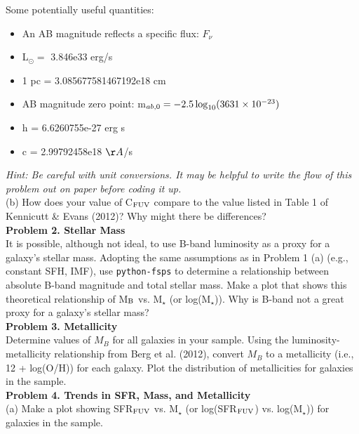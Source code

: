\documentclass{article}
\begin{document}
\noindent Some potentially useful quantities:

 \begin{itemize}
\item An AB magnitude reflects a specific flux: $F_{\nu}$
\item L$_{\odot} =$ 3.846e33 erg/s
\item 1 pc = 3.085677581467192e18 cm
\item AB magnitude zero point: m$_{ab,0} = -2.5\, {\rm log}_{10}(3631\times10^{-23})$
\item h = 6.6260755e-27 erg s
\item c = 2.99792458e18 $\AA$/s
\end{itemize}

\noindent \textit{Hint: Be careful with unit conversions.  It may be helpful to write the flow of this problem out on paper before coding it up.} \\

(b) How does your value of C$_{\rm FUV}$ compare to the value listed in Table 1 of Kennicutt \& Evans (2012)?  Why might there be differences? \\

\noindent \textbf{Problem 2. Stellar Mass} \\

It is possible, although not ideal, to use B-band luminosity as a proxy for a galaxy's stellar mass. Adopting the same assumptions as in Problem 1 (a) (e.g., constant SFH, IMF), use \texttt{python-fsps} to determine a relationship between absolute B-band magnitude and total stellar mass.  Make a plot that shows this theoretical relationship of M$_{\rm B}$ vs. M$_{\star}$ (or log(M$_{\star}$)).  Why is B-band not a great proxy for a galaxy's stellar mass? \\

\noindent \textbf{Problem 3. Metallicity} \\

Determine values of $M_B$ for all galaxies in your sample.  Using the luminosity-metallicity relationship from Berg et al. (2012), convert $M_B$ to a metallicity (i.e., 12 + log(O/H)) for each galaxy.  Plot the distribution of metallicities for galaxies in the sample.  \\

\noindent \textbf{Problem 4. Trends in SFR, Mass, and Metallicity} \\

(a) Make a plot showing SFR$_{\rm FUV}$ vs. M$_{\star}$ (or log(SFR$_{\rm FUV}$) vs. log(M$_{\star}$)) for galaxies in the sample. \\
\end{document}
